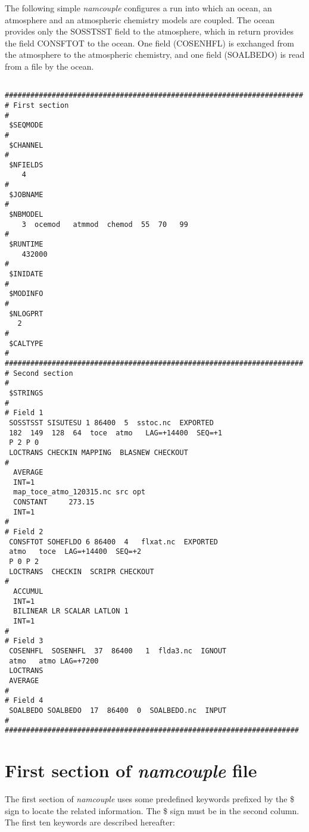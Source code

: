 The following simple {\it namcouple} configures a run into which an
ocean, an atmosphere and an atmospheric chemistry models are
coupled. The ocean provides only the SOSSTSST field to the atmosphere,
which in return provides the field CONSFTOT to the ocean. One field
(COSENHFL) is exchanged from the atmosphere to the
atmospheric chemistry, and one field (SOALBEDO) is read from a file by
the ocean.

\begin{verbatim}

######################################################################
# First section
#
 $SEQMODE
#
 $CHANNEL
#
 $NFIELDS
    4  
#
 $JOBNAME
#
 $NBMODEL
    3  ocemod   atmmod  chemod  55  70   99 
#
 $RUNTIME
    432000
#
 $INIDATE
#
 $MODINFO
#
 $NLOGPRT
   2
#
 $CALTYPE
#
######################################################################
# Second section 
#
 $STRINGS
#
# Field 1
 SOSSTSST SISUTESU 1 86400  5  sstoc.nc  EXPORTED
 182  149  128  64  toce  atmo   LAG=+14400  SEQ=+1
 P 2 P 0
 LOCTRANS CHECKIN MAPPING  BLASNEW CHECKOUT 
#
  AVERAGE 
  INT=1
  map_toce_atmo_120315.nc src opt
  CONSTANT     273.15 
  INT=1
#
# Field 2
 CONSFTOT SOHEFLDO 6 86400  4   flxat.nc  EXPORTED
 atmo   toce  LAG=+14400  SEQ=+2
 P 0 P 2
 LOCTRANS  CHECKIN  SCRIPR CHECKOUT
#
  ACCUMUL 
  INT=1
  BILINEAR LR SCALAR LATLON 1
  INT=1
#
# Field 3
 COSENHFL  SOSENHFL  37  86400   1  flda3.nc  IGNOUT 
 atmo   atmo LAG=+7200 
 LOCTRANS
 AVERAGE
#
# Field 4
 SOALBEDO SOALBEDO  17  86400  0  SOALBEDO.nc  INPUT
#
#####################################################################
\end{verbatim}


\section{ First section of {\it namcouple} file}
\label{subsec_namcouplefirst}

The first section of {\it namcouple } uses some predefined keywords
prefixed by the \$ sign to locate the related information. The
\$ sign must be in the second column. The first ten keywords
are described hereafter:

